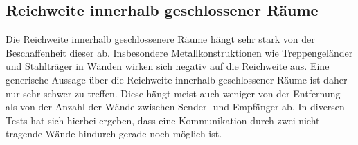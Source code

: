 \subsection{Reichweite innerhalb geschlossener Räume}
Die Reichweite innerhalb geschlossenere Räume hängt sehr stark von der Beschaffenheit dieser ab. Insbesondere
Metallkonstruktionen wie Treppengeländer und Stahlträger in Wänden wirken sich negativ auf die
Reichweite aus. Eine generische Aussage über die Reichweite innerhalb geschlossener Räume ist daher nur 
sehr schwer zu treffen. Diese hängt meist auch weniger von der Entfernung als von der Anzahl der
Wände zwischen Sender- und Empfänger ab. In diversen Tests hat sich hierbei ergeben, dass eine
Kommunikation durch zwei nicht tragende Wände hindurch gerade noch möglich ist.
